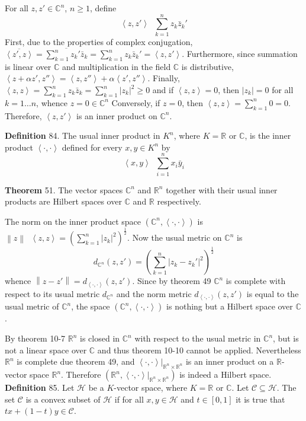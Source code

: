 \documentclass[a4paper]{article}
\newcommand{\clo}[1]{\left [ #1 \right ]}
\newcommand{\brac}[1]{\left ( #1 \right )}
\newcommand{\induc}[1]{\left . #1 \right \vert}
\newcommand{\abs}[1]{\left | #1 \right |}
\newcommand{\nrm}[1]{\left\| #1 \right \|}
\newcommand{\brkt}[1]{\left\langle #1 \right\rangle}
\newcommand{\Real}{\mathbb{R}}
\newcommand{\Cplx}{\mathbb{C}}
\newcommand{\Hcal}{\mathcal{H}}
\newcommand{\Ccal}{\mathcal{C}}
\newcommand{\defn}{\mathop{\overset{\Delta}{=}}\nolimits}
\begin{document}
For all $z,z'\in \Cplx^n$, $n\geq 1$, define \[\brkt{z,z'}\defn \sum_{k=1}^n z_k \bar{z}_k'\] First, due to the properties of complex conjugation, $\overline{\brkt{z',z}} = \overline{\sum_{k=1}^n z_k' \bar{z}_k} = \sum_{k=1}^n z_k \bar{z}_k' = \brkt{z,z'}$. Furthermore, since summation is linear over $\Cplx$ and multiplication in the field $\Cplx$ is distributive, $\brkt{z+\alpha z', z''} = \brkt{z,z''}+\alpha \brkt{z',z''}$. Finally, $\brkt{z,z} = \sum_{k=1}^n z_k \bar{z}_k = \sum_{k=1}^n \abs{z_k}^2 \geq 0$ and if $\brkt{z,z} = 0$, then $\abs{z_k}=0$ for all $k=1\ldots n$, whence $z = 0\in \Cplx^n$ Conversely, if $z=0$, then $\brkt{z,z} = \sum_{k=1}^n 0 = 0$. Therefore, $\brkt{z,z'}$ is an inner product on $\Cplx^n$.

\noindent \textbf{Definition} 84.
The usual inner product in $K^n$, where $K=\Real$ or $\Cplx$,  is the inner product $\brkt{\cdot,\cdot}$ defined for every $x,y\in K^n$ by \[\brkt{x,y}\defn \sum_{i=1}^n x_i \bar{y}_i\]

\label{thm:real_complex_hilbert_spaces} \noindent \textbf{Theorem} 51.
The vector spaces $\Cplx^n$ and $\Real^n$ together with their usual inner products are Hilbert spaces over $\Cplx$ and $\Real$ respectively.

The norm on the inner product space $\brac{\Cplx^n, \brkt{\cdot,\cdot}}$ is $\nrm{z}\defn \brkt{z,z} = \brac{\sum_{k=1}^n \abs{z_k}^2}^\frac{1}{2}$. Now the usual metric on $\Cplx^n$ is \[d_{\Cplx^n}\brac{z,z'} = \brac{\sum_{k=1}^n \abs{z_k-z_k'}^2}^\frac{1}{2}\] whence $\nrm{z-z'} = d_{\brkt{\cdot, \cdot}}\brac{z,z'}$. Since by theorem 49 $\Cplx^n$ is complete with respect to its usual metric $d_{\Cplx^n}$ and the norm metric $d_{\brkt{\cdot, \cdot}}\brac{z,z'}$ is equal to the usual metric of $\Cplx^n$, the space $\brac{\Cplx^n, \brkt{\cdot,\cdot}}$ is nothing but a Hilbert space over $\Cplx$.

By theorem 10-7 $\Real^n$ is closed in $\Cplx^n$ with respect to the usual metric in $\Cplx^n$, but is not a linear space over $\Cplx$ and thus theorem 10-10 cannot be applied. Nevertheless $\Real^n$ is complete due theorem 49, and $\induc{\brkt{\cdot,\cdot}}_{\Real^n\times \Real^n}$ is an inner product on a $\Real$-vector space $\Real^n$. Therefore $\brac{\Real^n,\induc{\brkt{\cdot,\cdot}}_{\Real^n\times \Real^n}}$ is indeed a Hilbert space.\\

\noindent \textbf{Definition} 85.
Let $\Hcal$ be a $K$-vector space, where $K=\Real$ or $\Cplx$. Let $\Ccal\subseteq \Hcal$. The set $\Ccal$ is a convex subset of $\Hcal$ if for all $x,y\in \Hcal$ and $t\in \clo{0,1}$ it is true that $tx + \brac{1-t}y\in \Ccal$.
\end{document}
